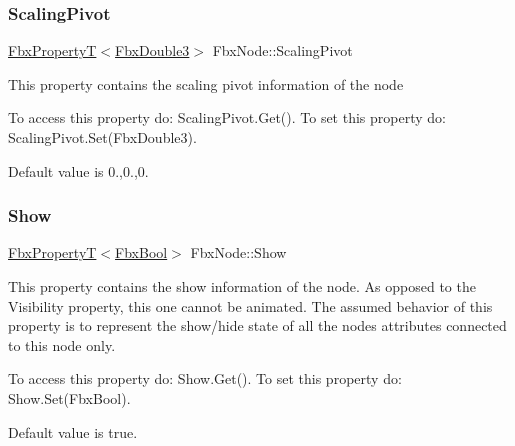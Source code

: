\subsubsection{\texorpdfstring{Scaling\+Pivot}{ScalingPivot}}
{\footnotesize\ttfamily \hyperlink{class_fbx_property_t}{Fbx\+PropertyT}$<$\hyperlink{fbxtypes_8h_ae0a96f14cde566774c7553aa7523b7a7}{Fbx\+Double3}$>$ Fbx\+Node\+::\+Scaling\+Pivot}

This property contains the scaling pivot information of the node

To access this property do\+: Scaling\+Pivot.\+Get(). To set this property do\+: Scaling\+Pivot.\+Set(\+Fbx\+Double3).

Default value is 0.,0.,0. \mbox{\label{class_fbx_node_a685ccf0b6e1bc5070c28d9e7a8823c74}} 
\subsubsection{\texorpdfstring{Show}{Show}}
{\footnotesize\ttfamily \hyperlink{class_fbx_property_t}{Fbx\+PropertyT}$<$\hyperlink{fbxtypes_8h_a92e0562b2fe33e76a242f498b362262e}{Fbx\+Bool}$>$ Fbx\+Node\+::\+Show}

This property contains the show information of the node. As opposed to the Visibility property, this one cannot be animated. The assumed behavior of this property is to represent the show/hide state of all the nodes attributes connected to this node only.

To access this property do\+: Show.\+Get(). To set this property do\+: Show.\+Set(\+Fbx\+Bool).

Default value is true.

